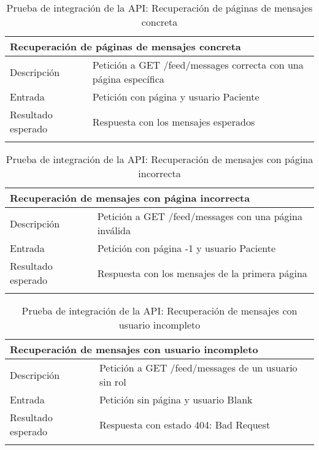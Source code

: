 \vspace{-10pt}
\begin{longtable}{|p{} p{}|}
    \hline
    \multicolumn{2}{|l|}{\textbf{Recuperación de páginas de mensajes concreta}} \\ \hline 
    Descripción                 & Petición a GET /feed/messages correcta con una página específica \\ \hline
    Entrada                     & Petición con página y usuario Paciente \\ \hline
    Resultado esperado          & Respuesta con los mensajes esperados \\ \hline
    \caption{Prueba de integración de la API: Recuperación de páginas de mensajes concreta}
    \label{cp:i:api:recuperacion_paginas_mensajes_concreta}
\end{longtable}

\vspace{-20pt}
\begin{longtable}{|p{} p{}|}
    \hline
    \multicolumn{2}{|l|}{\textbf{Recuperación de mensajes con página incorrecta}} \\ \hline 
    Descripción                 & Petición a GET /feed/messages con una página inválida \\ \hline
    Entrada                     & Petición con página -1 y usuario Paciente \\ \hline
    Resultado esperado          & Respuesta con los mensajes de la primera página \\ \hline
    \caption{Prueba de integración de la API: Recuperación de mensajes con página incorrecta}
    \label{cp:i:api:recuperacion_mensajes_pagina_incorrecta}
\end{longtable}

\begin{longtable}{|p{} p{}|}
    \hline
    \multicolumn{2}{|l|}{\textbf{Recuperación de mensajes con usuario incompleto}} \\ \hline 
    Descripción                 & Petición a GET /feed/messages de un usuario sin rol \\ \hline
    Entrada                     & Petición sin página y usuario Blank \\ \hline
    Resultado esperado          & Respuesta con estado 404: Bad Request \\ \hline
    \caption{Prueba de integración de la API: Recuperación de mensajes con usuario incompleto}
    \label{cp:i:api:recuperacion_mensajes_usuario_incompleto}
\end{longtable}

